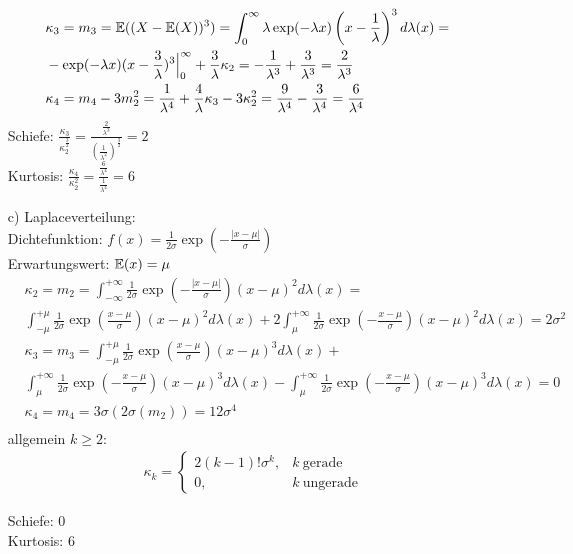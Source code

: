 \begin{solution}
\begin{itemize}
\begin{align*}
    &\kappa_3 = m_3 = \mathbb{E}((X-\mathbb{E}(X))^{3}) = \int_0^{\infty}\lambda\exp(-\lambda x)\left(x-\frac{1}{\lambda}\right)^3d\lambda(x) =\\
    &-\exp(-\lambda x)(x-\frac{3}{\lambda})^3\Big|_0^{\infty} + \frac{3}{\lambda}\kappa_2 = -\frac{1}{\lambda^3} + \frac{3}{\lambda^3} =  \frac{2}{\lambda^3} \\
    &\kappa_4 = m_4 - 3m_2^2 = \frac{1}{\lambda^4} +\frac{4}{\lambda}\kappa_3 - 3\kappa_2^2 = \frac{9}{\lambda^4} - \frac{3}{\lambda^4} =
    \frac{6}{\lambda^4}
  \end{align*}
  Schiefe: $\frac{\kappa_3}{\kappa_2^{\frac{3}{2}}} = \frac{\frac{2}{\lambda^3}}{\left(\frac{1}{\lambda^2}\right)^{\frac{3}{2}}} = 2$ \\
  Kurtosis: $\frac{\kappa_4}{\kappa_2^2} = \frac{\frac{6}{\lambda^4}}{\frac{1}{\lambda^4}} = 6$
  \item[c)] Laplaceverteilung: \\
  Dichtefunktion: $f(x) =  \frac{1}{2\sigma}\exp(-\frac{|x-\mu|}{\sigma})$ \\
  Erwartungswert: $\mathbb{E}(x) = \mu$
  \begin{align*}
    &\kappa_2 = m_2 = \int_{-\infty}^{+\infty}\frac{1}{2\sigma}\exp(-\frac{|x-\mu|}{\sigma})(x-\mu)^2d\lambda(x) = \\
    &\int_{-\mu}^{+\mu}\frac{1}{2\sigma}\exp(\frac{x-\mu}{\sigma})(x-\mu)^2d\lambda(x) +
    2\int_{\mu}^{+\infty}\frac{1}{2\sigma}\exp(-\frac{x-\mu}{\sigma})(x-\mu)^2d\lambda(x) = 2\sigma^2\\
    &\kappa_3 = m_3 = \int_{-\mu}^{+\mu}\frac{1}{2\sigma}\exp(\frac{x-\mu}{\sigma})(x-\mu)^3d\lambda(x) +\\
    &\int_{\mu}^{+\infty}\frac{1}{2\sigma}\exp(-\frac{x-\mu}{\sigma})(x-\mu)^3d\lambda(x)
    - \int_{\mu}^{+\infty}\frac{1}{2\sigma}\exp(-\frac{x-\mu}{\sigma})(x-\mu)^3d\lambda(x) = 0\\
    &\kappa_4 = m_4 = 3\sigma(2\sigma(m_2)) = 12\sigma^4 \\
  \end{align*}
  allgemein $k \geq 2$:
  \begin{align*}
  &\kappa_k =
  \begin{cases} 2(k-1)!\sigma^k, & k~ \text{gerade} \\ 0, & k~ \text{ungerade}
  \end{cases}
  \end{align*}

  Schiefe: $0$ \\
  Kurtosis: $6$
\end{itemize}

\end{solution}
